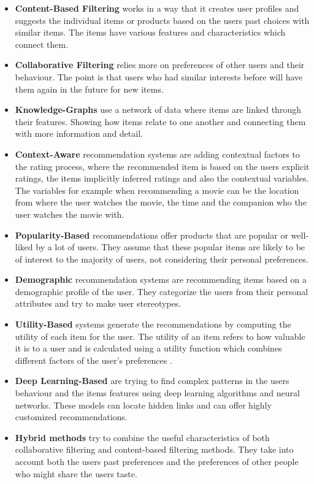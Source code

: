 \documentclass[\myFontSize,oneside,english,hidelinks,a4paper]{article}
\begin{document}
\begin{itemize}[label=--]
\item \textbf{Content-Based Filtering} works in a way that it creates user profiles and suggests the individual items or products based on the users past choices with similar items. The items have various features and characteristics which connect them.
\item \textbf{Collaborative Filtering} relies more on preferences of other users and their behaviour. The point is that users who had similar interests before will have them again in the future for new items.
\item \textbf{Knowledge-Graphs} use a network of data where items are linked through their features. Showing how items relate to one another and connecting them with more information and detail.
\item \textbf{Context-Aware} recommendation systems are adding contextual factors to the rating process, where the recommended item is based on the users explicit ratings, the items implicitly inferred ratings and also the contextual variables. The variables for example when recommending a movie can be the location from where the user watches the movie, the time and the companion who the user watches the movie with.
\item \textbf{Popularity-Based} recommendations offer products that are popular or well-liked by a lot of users. They assume that these popular items are likely to be of interest to the majority of users, not considering their personal preferences.
\item \textbf{Demographic} recommendation systems are recommending items based on a demographic profile of the user. They categorize the users from their personal attributes and try to make user stereotypes.
\item \textbf{Utility-Based} systems generate the recommendations by computing the utility of each item for the user. The utility of an item refers to how valuable it is to a user and is calculated using a utility function which combines different factors of the user's preferences \cite{Burke2002331}.
\item \textbf{Deep Learning-Based} are trying to find complex patterns in the users behaviour and the items features using deep learning algorithms and neural networks. These models can locate hidden links and can offer highly customized recommendations.
\item \textbf{Hybrid methods} try to combine the useful characteristics of both collaborative filtering and content-based filtering methods. They take into account both the users past preferences and the preferences of other people who might share the users taste. \\
\end{itemize}
%
%
%
%
%
\end{document}
